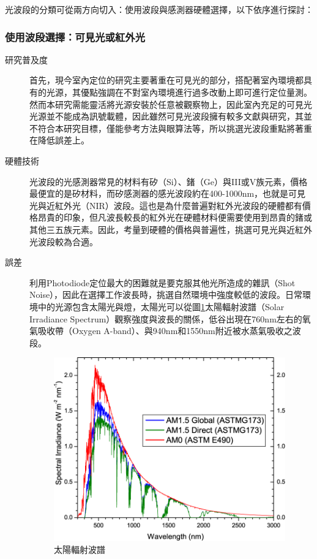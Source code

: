         光波段的分類可從兩方向切入：使用波段與感測器硬體選擇，以下依序進行探討：

        \subsubsection{使用波段選擇：可見光或紅外光}

        \begin{description}
        \item[研究普及度]\hfill 

        首先，現今室內定位的研究主要著重在可見光的部分\cite{survey_light2018}，搭配著室內環境都具有的光源，其優點強調在不對室內環境進行過多改動上即可進行定位量測。然而本研究需能靈活將光源安裝於任意被觀察物上，因此室內充足的可見光光源並不能成為訊號載體，因此雖然可見光波段擁有較多文獻與研究，其並不符合本研究目標，僅能參考方法與眼算法等，所以挑選光波段重點將著重在降低誤差上。

        \item[硬體技術] \hfill 
        
        光波段的光感測器常見的材料有矽（Si）、鍺（Ge）與III或V族元素，價格最便宜的是矽材料，而矽感測器的感光波段約在400-1000nm，也就是可見光與近紅外光（NIR）波段。這也是為什麼普遍對紅外光波段的硬體都有價格昂貴的印象，但凡波長較長的紅外光在硬體材料便需要使用到昂貴的鍺或其他三五族元素\cite{si_pd}。因此，考量到硬體的價格與普遍性，挑選可見光與近紅外光波段較為合適。

        \item[誤差] \hfill 
        利用Photodiode定位最大的困難就是要克服其他光所造成的雜訊（Shot Noise），因此在選擇工作波長時，挑選自然環境中強度較低的波段。日常環境中的光源包含太陽光與燈，太陽光可以從圖\ref{pic:solar_spectrum}太陽輻射波譜（Solar Irradiance Spectrum）觀察強度與波長的關係，低谷出現在760nm左右的氧氣吸收帶（Oxygen A-band）、與940nm和1550nm附近被水蒸氣吸收之波段\cite{book:solar_spectrum}。

        \begin{figure}[ht]
            \centering
            \includegraphics[width=10cm]{ch2pic/solar_spectra.png}
            \caption{太陽輻射波譜\cite{astm}}
            \label{pic:solar_spectrum}
        \end{figure}


\end{description}
